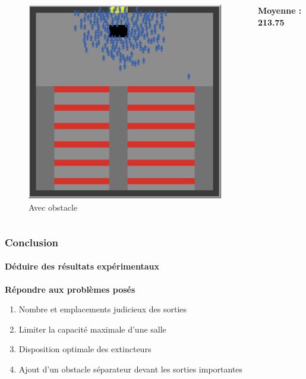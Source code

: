 \documentclass[10pt]{beamer}
\begin{document}
\begin{frame}
\begin{columns}
			\begin{figure}
				\includegraphics[scale = 0.35]{capture_obstacle.PNG}
 				\caption{Avec obstacle}
 				\label{pic: obstacle2}
 			\end{figure}
 			
 		\hspace{4em}\textbf{Moyenne : 213.75}

	\end{columns}
	
	
	



\end{frame}

\begin{frame}
	\frametitle{\textbf {\Large Conclusion}}
	\framesubtitle{\large Déduire des résultats expérimentaux}
	\begin{block}{\textbf {\large Répondre aux problèmes posés}}
	\medskip
		\begin{enumerate}
			\item Nombre et emplacements judicieux des sorties 
			\medskip
			\item Limiter la capacité maximale d'une salle 
			\medskip
			\item Disposition optimale des extincteurs
			\medskip
			\item Ajout d'un obstacle séparateur devant les sorties importantes
			
		\end{enumerate}
	\end{block}
\end{frame}
\end{document}
